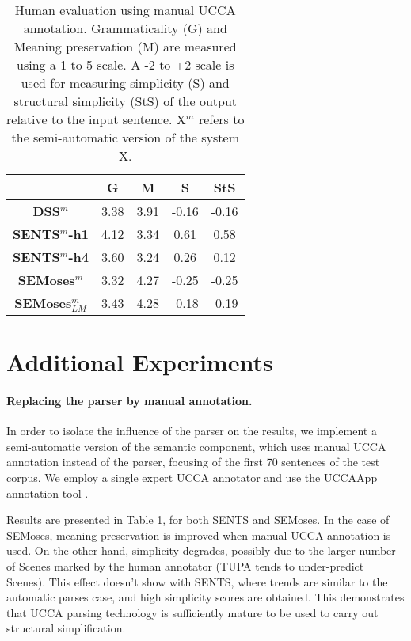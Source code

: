 \documentclass[11pt,a4paper]{article}
\begin{document}
\vspace{-0.3cm}
\begin{center}
\begin{table}[t]
\scriptsize
\centering
\begin{tabular}{|c|c|c|c|c|}
\hline
& {\bf G} & {\bf M} & {\bf S} & {\bf StS} \\
\hline\hline
{\bf DSS$^m$}& 3.38& 3.91& -0.16& -0.16 \\
\hline
{\bf SENTS$^m$-h1} & 4.12 & 3.34 & 0.61 & 0.58 \\
\hline
{\bf SENTS$^{m}$-h4} & 3.60 & 3.24 & 0.26 & 0.12 \\
\hline
{\bf SEMoses}$^{m}$ & 3.32& 4.27& -0.25& -0.25 \\
\hline
{\bf SEMoses}$_{LM}^{m}$ & 3.43& 4.28 & -0.18& -0.19 \\
\hline    
\end{tabular}
\vspace{-0.1cm}
\hfill
\caption{\label{tab:human_evaluation_semisuper}
Human evaluation using manual UCCA annotation. Grammaticality (G) and Meaning preservation (M) are measured using a 1 to 5 scale. A -2 to +2 scale is used for measuring simplicity (S) and structural simplicity (StS) of the output relative to the input sentence. X$^m$ refers to the semi-automatic version of the system X.
}
\end{table}
\end{center}

\section{Additional Experiments} \label{sec:additional_exps}

\paragraph{Replacing the parser by manual annotation.}
In order to isolate the influence of the parser on the results, we implement a semi-automatic version of the semantic component, 
which uses manual UCCA annotation instead of the parser, focusing of the first 70 sentences of the test corpus. 
We employ a single expert UCCA annotator and use the UCCAApp annotation tool \cite{A17}.

Results are presented in Table \ref{tab:human_evaluation_semisuper}, for both SENTS and SEMoses. 
In the case of SEMoses, meaning preservation is improved when manual UCCA annotation is used. 
On the other hand, simplicity degrades, possibly due to the larger number of Scenes marked by the human annotator
(TUPA tends to under-predict Scenes).
This effect doesn't show with SENTS, where trends are similar to the automatic parses case, and high simplicity scores are obtained.
This demonstrates that UCCA parsing technology is sufficiently mature to be used to carry out structural simplification.
\end{document}

